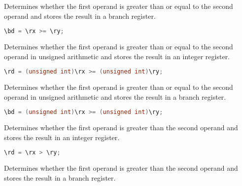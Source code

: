Determines whether the first operand is greater than or equal to the second
operand and stores the result in a branch register.

\begin{lstlisting}[numbers=none, basicstyle=\ttfamily\footnotesize, language=C++]
\bd = \rx >= \ry;
\end{lstlisting}

Determines whether the first operand is greater than or equal to the second
operand in unsigned arithmetic and stores the result in an integer register.

\begin{lstlisting}[numbers=none, basicstyle=\ttfamily\footnotesize, language=C++]
\rd = (unsigned int)\rx >= (unsigned int)\ry;
\end{lstlisting}

Determines whether the first operand is greater than or equal to the second
operand in unsigned arithmetic and stores the result in a branch register.

\begin{lstlisting}[numbers=none, basicstyle=\ttfamily\footnotesize, language=C++]
\bd = (unsigned int)\rx >= (unsigned int)\ry;
\end{lstlisting}

Determines whether the first operand is greater than the second operand and
stores the result in an integer register.

\begin{lstlisting}[numbers=none, basicstyle=\ttfamily\footnotesize, language=C++]
\rd = \rx > \ry;
\end{lstlisting}

Determines whether the first operand is greater than the second operand and
stores the result in a branch register.

